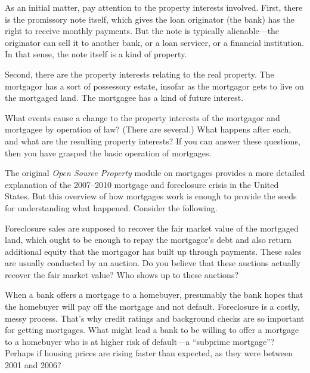 
\item As an initial matter, pay attention to the property interests involved.
First, there is the promissory note itself, which gives the loan originator (the
bank) has the right to receive monthly payments.
But the note is typically alienable---the originator can sell it to another
bank, or a loan servicer, or a financial institution. In that sense, the note
itself is a kind of property.


\item Second, there are the property interests relating to the real property.
The mortgagor has a sort of possessory estate, insofar as the mortgagor gets to
live on the mortgaged land. The mortgagee has a kind of future interest.

What events cause a change to the
property interests of the mortgagor and mortgagee by operation of law? (There
are several.) What happens after each, and what are the resulting property
interests? If you can answer these questions, then you have grasped the basic
operation of mortgages.

\item The original \emph{Open Source Property} module on mortgages provides a
more detailed explanation of the 2007--2010 mortgage and foreclosure crisis in
the United States. But this overview of how mortgages work is enough to provide
the seeds for understanding what happened. Consider the following.

\item Foreclosure sales are supposed to recover the fair market value of the
mortgaged land, which ought to be enough to repay the mortgagor's debt and also
return additional equity that the mortgagor has built up through payments. These
sales are usually conducted by an auction. Do you believe that these auctions
actually recover the fair market value? Who shows up to these auctions?

\item When a bank offers a mortgage to a homebuyer, presumably the bank hopes
that the homebuyer will pay off the mortgage and not default. Foreclosure is a
costly, messy process. That's why credit ratings and background checks are so
important for getting mortgages. What might lead a bank to be willing to offer a
mortgage to a homebuyer who is at higher risk of default---a ``subprime
mortgage''? Perhaps if housing prices are rising faster than expected, as they
were between 2001 and 2006?

